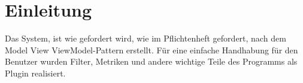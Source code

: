 \chapter{Einleitung}

Das System, \projektTitel ist wie gefordert wird, wie im Pflichtenheft gefordert, nach dem Model View ViewModel-Pattern erstellt.
Für eine einfache Handhabung für den Benutzer wurden Filter, Metriken und andere wichtige Teile des Programms als Plugin realisiert.
